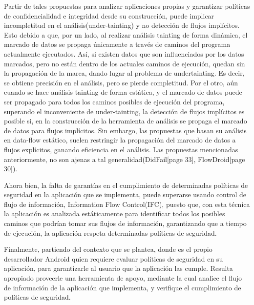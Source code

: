 Partir de tales propuestas para analizar aplicaciones propias y garantizar
políticas de confidencialidad e integridad desde su construcción, puede implicar
incompletitud en el análisis(under-tainting) y no detección de flujos
implícitos. Esto debido a que,
por un lado, al realizar análisis tainting de forma dinámica, el marcado de
datos se propaga únicamente a través de caminos del programa actualmente
ejecutados. Así, si existen datos que son influenciados por los datos marcados,
pero no están dentro de los actuales caminos de ejecución, quedan sin la
propagación de la marca, dando lugar al problema de
undertainting\cite{dynamic-tainting}\cite{Bit-Level-Taint-Analysis}. Es
decir, se obtiene precisión en el análisis, pero se pierde completitud.\newline
Por el otro, aún cuando se hace análisis tainting de forma estática, y el
marcado de datos puede ser propagado para todos los caminos posibles de
ejecución  del programa, superando el inconveniente de under-tainting, la
detección de flujos implícitos es posible si, en la construcción de la
herramienta de análisis se propaga el marcado de datos para flujos
implícitos\cite{taint-analysis}. 
Sin embargo, las propuestas que basan su análisis en data-flow estático,
suelen restringir la propagación del marcado de datos a flujos explícitos,
ganando eficiencia en el análisis. Las propuestas mencionadas anteriormente, no
son ajenas a tal generalidad(DidFail\cite{DidFail}[page 33],
FlowDroid\cite{FlowDroid-Thesis}[page 30]).

Ahora bien, la falta de garantías en el cumplimiento de determinadas
políticas de seguridad en la aplicación que se implementa, puede superarse
usando control de flujo de información, Information Flow Control(IFC), puesto
que, con esta técnica la aplicación  es analizada estáticamente  para
identificar todos los posibles caminos que podrían tomar sus flujos de
información, garantizando que a tiempo de ejecución, la aplicación respeta
determinadas políticas de seguridad.

Finalmente, partiendo del contexto que se plantea, donde es el propio
desarrollador Android quien requiere evaluar políticas de seguridad en su
aplicación, para  garantizarle al usuario que la aplicación las cumple. Resulta
apropiado proveerle una herramienta de apoyo, mediante la cual analice el flujo
de información de la aplicación que implementa, y verifique el cumplimiento
de políticas de seguridad.\newline

















